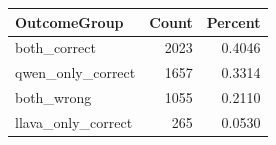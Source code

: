 \begin{tabular}{lrr}
\toprule
OutcomeGroup & Count & Percent \\
\midrule
both_correct & 2023 & 0.4046 \\
qwen_only_correct & 1657 & 0.3314 \\
both_wrong & 1055 & 0.2110 \\
llava_only_correct & 265 & 0.0530 \\
\bottomrule
\end{tabular}
